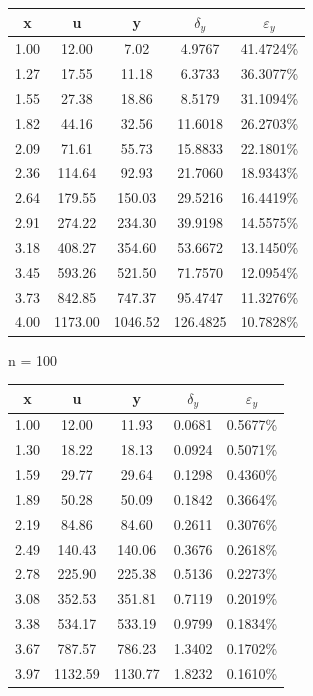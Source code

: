 \documentclass[fontsize=14pt,DIV=1,a4paper]{scrartcl}
\begin{document}
    \begin{tabular}{| c | c | c | c | c |}
        \hline
        x & u & y & $\delta_y$ & $\varepsilon_y$ \\
        \hline
        1.00 &   12.00 &    7.02 &    4.9767 &   41.4724\% \\
        1.27 &   17.55 &   11.18 &    6.3733 &   36.3077\% \\
        1.55 &   27.38 &   18.86 &    8.5179 &   31.1094\% \\
        1.82 &   44.16 &   32.56 &   11.6018 &   26.2703\% \\
        2.09 &   71.61 &   55.73 &   15.8833 &   22.1801\% \\
        2.36 &  114.64 &   92.93 &   21.7060 &   18.9343\% \\
        2.64 &  179.55 &  150.03 &   29.5216 &   16.4419\% \\
        2.91 &  274.22 &  234.30 &   39.9198 &   14.5575\% \\
        3.18 &  408.27 &  354.60 &   53.6672 &   13.1450\% \\
        3.45 &  593.26 &  521.50 &   71.7570 &   12.0954\% \\
        3.73 &  842.85 &  747.37 &   95.4747 &   11.3276\% \\
        4.00 & 1173.00 & 1046.52 &  126.4825 &   10.7828\% \\
        \hline
    \end{tabular}

    \vspace{10px}
    n = 100
    \vspace{10px}

    \begin{tabular}{| c | c | c | c | c |}
        \hline
        x & u & y & $\delta_y$ & $\varepsilon_y$ \\
        \hline
        1.00 &   12.00 &   11.93 &    0.0681 &    0.5677\% \\
        1.30 &   18.22 &   18.13 &    0.0924 &    0.5071\% \\
        1.59 &   29.77 &   29.64 &    0.1298 &    0.4360\% \\
        1.89 &   50.28 &   50.09 &    0.1842 &    0.3664\% \\
        2.19 &   84.86 &   84.60 &    0.2611 &    0.3076\% \\
        2.49 &  140.43 &  140.06 &    0.3676 &    0.2618\% \\
        2.78 &  225.90 &  225.38 &    0.5136 &    0.2273\% \\
        3.08 &  352.53 &  351.81 &    0.7119 &    0.2019\% \\
        3.38 &  534.17 &  533.19 &    0.9799 &    0.1834\% \\
        3.67 &  787.57 &  786.23 &    1.3402 &    0.1702\% \\
        3.97 & 1132.59 & 1130.77 &    1.8232 &    0.1610\% \\
        \hline
    \end{tabular}
    
\end{document}
